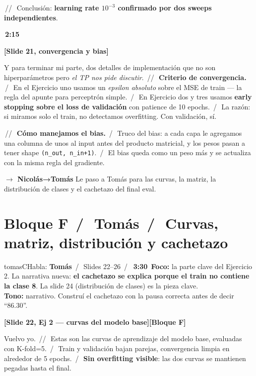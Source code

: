 \documentclass[11pt,a4paper]{article}
\newcommand{\code}[1]{\texttt{\textcolor{accent}{#1}}}
\newcommand{\slidenum}[1]{\textcolor{accent}{\textbf{[Slide #1]}}}
\newcommand{\timing}[1]{\textcolor{muted}{\textbf{\,#1\,}}}
\newcommand{\bloque}[1]{\textcolor{muted}{\small\textbf{[Bloque #1]}}}
\newcommand{\enunciado}[1]{\textcolor{warn}{\textit{#1}}}
\newcommand{\pausa}{\textcolor{muted}{\,/\,}}
\newcommand{\Pausa}{\textcolor{muted}{\,/\!/\,}}
\newcommand{\paso}[1]{\textcolor{accent}{\textbf{$\to$ #1}}}
\begin{document}
\Pausa\ Conclusión: \textbf{learning rate $10^{-3}$ confirmado por dos sweeps independientes}.

\timing{2:15}

\slidenum{21, convergencia y bias}

Y para terminar mi parte, dos detalles de implementación que no son hiperparámetros pero \enunciado{el TP nos pide discutir}. \Pausa\ \textbf{Criterio de convergencia.} \pausa\ En el Ejercicio uno usamos un \emph{epsilon absoluto} sobre el MSE de train --- la regla del apunte para perceptrón simple. \pausa\ En Ejercicio dos y tres usamos \textbf{early stopping sobre el loss de validación} con patience de 10 epochs. \pausa\ La razón: si miramos solo el train, no detectamos overfitting. Con validación, sí.

\Pausa\ \textbf{Cómo manejamos el bias.} \pausa\ Truco del bias: a cada capa le agregamos una columna de unos al input antes del producto matricial, y los pesos pasan a tener shape \code{(n\_out, n\_in+1)}. \pausa\ El bias queda como un peso más y se actualiza con la misma regla del gradiente.

\paso{Nicolás→Tomás} \quad Le paso a Tomás para las curvas, la matriz, la distribución de clases y el cachetazo del final eval.

\section{Bloque F \pausa\ \textcolor{tomasC}{Tomás} \pausa\ Curvas, matriz, distribución y cachetazo}\label{sec:bloqueF}

\begin{personabox}{tomasC}{Habla: \textcolor{tomasC}{\textbf{Tomás}} \pausa\ Slides 22--26 \pausa\ \timing{3:30}}
\textbf{Foco:} la parte clave del Ejercicio 2. La narrativa nueva: \textbf{el cachetazo se explica porque el train no contiene la clase 8}. La slide 24 (distribución de clases) es la pieza clave.\\
\textbf{Tono:} narrativo. Construí el cachetazo con la pausa correcta antes de decir ``86.30''.
\end{personabox}

\slidenum{22, Ej 2 — curvas del modelo base}\quad \bloque{F}

Vuelvo yo. \Pausa\ Estas son las curvas de aprendizaje del modelo base, evaluadas con K-fold=5. \pausa\ Train y validación bajan parejas, convergencia limpia en alrededor de 5 epochs. \pausa\ \textbf{Sin overfitting visible}: las dos curvas se mantienen pegadas hasta el final.
\end{document}
